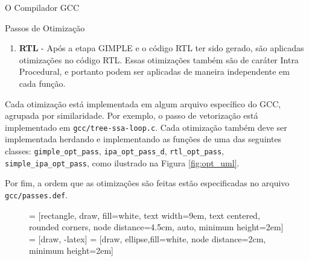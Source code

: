 \begin{section}{O Compilador GCC}
\begin{subsection}{Passos de Otimização}
\begin{enumerate}
        \item \textbf{RTL} - Após a etapa GIMPLE e o código RTL ter sido gerado,
            são aplicadas otimizações no código RTL. Essas otimizações também são
            de caráter Intra Procedural, e portanto podem ser aplicadas de maneira
            independente em cada função.
    \end{enumerate}

    Cada otimização está implementada em algum arquivo específico do GCC,
agrupada por similaridade. Por exemplo, o passo de vetorização está implementado
em \texttt{gcc/tree-ssa-loop.c}. Cada otimização também deve ser implementada
    herdando e implementando as funções de uma das seguintes classes:
\texttt{gimple\_opt\_pass}, \texttt{ipa\_opt\_pass\_d}, \texttt{rtl\_opt\_pass},
    \texttt{simple\_ipa\_opt\_pass}, como ilustrado na Figura \ref{fig:opt_uml}.

    Por fim, a ordem que as otimizações são feitas estão
especificadas no arquivo \texttt{gcc/passes.def}.

\begin{figure}
 = [rectangle, draw, fill=white,
    text width=9em, text centered, rounded corners, node distance=4.5cm, auto, minimum height=2em]
 = [draw, -latex]
 = [draw, ellipse,fill=white, node distance=2cm,
    minimum height=2em]
\begin{center}
\end{center}
\end{figure}
\end{subsection}
\end{section}

